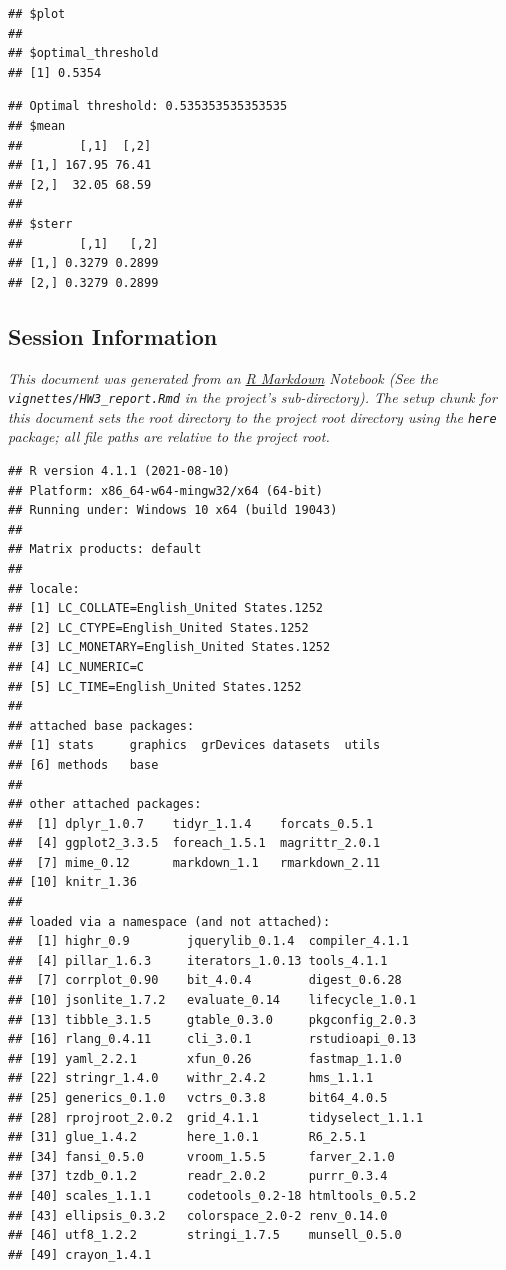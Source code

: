 \documentclass[
  11pt,
  a4paper,
]{scrartcl}
\begin{document}
\begin{verbatim}
## $plot
## 
## $optimal_threshold
## [1] 0.5354
\end{verbatim}

\begin{verbatim}
## Optimal threshold: 0.535353535353535
## $mean
##        [,1]  [,2]
## [1,] 167.95 76.41
## [2,]  32.05 68.59
## 
## $sterr
##        [,1]   [,2]
## [1,] 0.3279 0.2899
## [2,] 0.3279 0.2899
\end{verbatim}

\newpage

\hypertarget{session-information}{%
\subsection{Session Information}\label{session-information}}

\emph{This document was generated from an
\href{http://rmarkdown.rstudio.com}{R Markdown} Notebook (See the
\texttt{vignettes/HW3\_report.Rmd} in the project's sub-directory). The
setup chunk for this document sets the root directory to the project
root directory using the \texttt{here} package; all file paths are
relative to the project root.}

\begin{verbatim}
## R version 4.1.1 (2021-08-10)
## Platform: x86_64-w64-mingw32/x64 (64-bit)
## Running under: Windows 10 x64 (build 19043)
## 
## Matrix products: default
## 
## locale:
## [1] LC_COLLATE=English_United States.1252 
## [2] LC_CTYPE=English_United States.1252   
## [3] LC_MONETARY=English_United States.1252
## [4] LC_NUMERIC=C                          
## [5] LC_TIME=English_United States.1252    
## 
## attached base packages:
## [1] stats     graphics  grDevices datasets  utils    
## [6] methods   base     
## 
## other attached packages:
##  [1] dplyr_1.0.7    tidyr_1.1.4    forcats_0.5.1 
##  [4] ggplot2_3.3.5  foreach_1.5.1  magrittr_2.0.1
##  [7] mime_0.12      markdown_1.1   rmarkdown_2.11
## [10] knitr_1.36    
## 
## loaded via a namespace (and not attached):
##  [1] highr_0.9        jquerylib_0.1.4  compiler_4.1.1  
##  [4] pillar_1.6.3     iterators_1.0.13 tools_4.1.1     
##  [7] corrplot_0.90    bit_4.0.4        digest_0.6.28   
## [10] jsonlite_1.7.2   evaluate_0.14    lifecycle_1.0.1 
## [13] tibble_3.1.5     gtable_0.3.0     pkgconfig_2.0.3 
## [16] rlang_0.4.11     cli_3.0.1        rstudioapi_0.13 
## [19] yaml_2.2.1       xfun_0.26        fastmap_1.1.0   
## [22] stringr_1.4.0    withr_2.4.2      hms_1.1.1       
## [25] generics_0.1.0   vctrs_0.3.8      bit64_4.0.5     
## [28] rprojroot_2.0.2  grid_4.1.1       tidyselect_1.1.1
## [31] glue_1.4.2       here_1.0.1       R6_2.5.1        
## [34] fansi_0.5.0      vroom_1.5.5      farver_2.1.0    
## [37] tzdb_0.1.2       readr_2.0.2      purrr_0.3.4     
## [40] scales_1.1.1     codetools_0.2-18 htmltools_0.5.2 
## [43] ellipsis_0.3.2   colorspace_2.0-2 renv_0.14.0     
## [46] utf8_1.2.2       stringi_1.7.5    munsell_0.5.0   
## [49] crayon_1.4.1
\end{verbatim}
\end{document}
